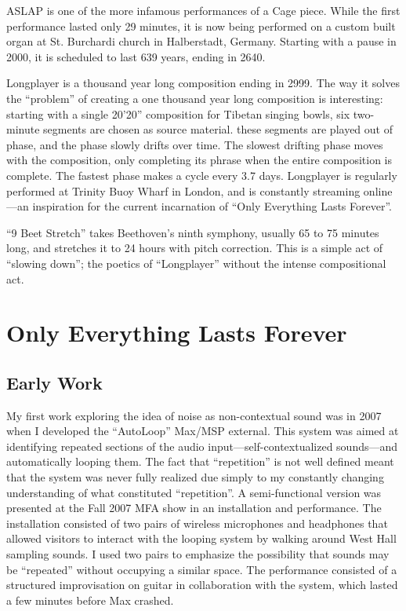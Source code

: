 \documentclass{thesis}
\begin{document}
ASLAP is one of the more infamous performances of a Cage piece. While the first performance lasted only 29 minutes, it is now being performed on a custom built organ at St. Burchardi church in Halberstadt, Germany. Starting with a pause in 2000, it is scheduled to last 639 years, ending in 2640.
	
Longplayer is a thousand year long composition ending in 2999. The way it solves the ``problem'' of creating a one thousand year long composition is interesting: starting with a single 20'20'' composition for Tibetan singing bowls, six two-minute segments are chosen as source material. these segments are played out of phase, and the phase slowly drifts over time. The slowest drifting phase moves with the composition, only completing its phrase when the entire composition is complete. The fastest phase makes a cycle every 3.7 days. Longplayer is regularly performed at Trinity Buoy Wharf in London, and is constantly streaming online---an inspiration for the current incarnation of ``Only Everything Lasts Forever''.

``9 Beet Stretch'' takes Beethoven's ninth symphony, usually 65 to 75 minutes long, and stretches it to 24 hours with pitch correction. This is a simple act of ``slowing down''; the poetics of ``Longplayer'' without the intense compositional act.
				
\chapter{Only Everything Lasts Forever}

\section{Early Work}

My first work exploring the idea of noise as non-contextual sound was in 2007 when I developed the ``AutoLoop'' Max/MSP external. This system was aimed at identifying repeated sections of the audio input---self-contextualized sounds---and automatically looping them. The fact that ``repetition'' is not well defined meant that the system was never fully realized due simply to my constantly changing understanding of what constituted ``repetition''. A semi-functional version was presented at the Fall 2007 MFA show in an installation and performance. The installation consisted of two pairs of wireless microphones and headphones that allowed visitors to interact with the looping system by walking around West Hall sampling sounds. I used two pairs to emphasize the possibility that sounds may be ``repeated'' without occupying a similar space. The performance consisted of a structured improvisation on guitar in collaboration with the system, which lasted a few minutes before Max crashed.
\end{document}
